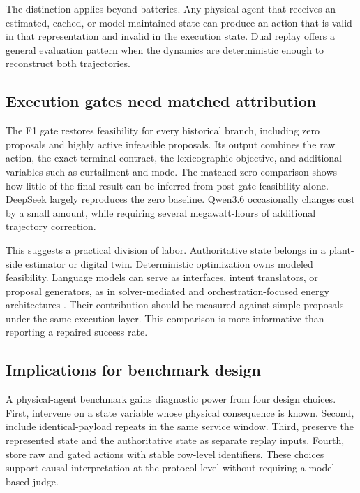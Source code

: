 \documentclass[11pt]{article}
\begin{document}
The distinction applies beyond batteries. Any physical agent that receives an estimated,
cached, or model-maintained state can produce an action that is valid in that representation and
invalid in the execution state. Dual replay offers a general evaluation pattern when the dynamics
are deterministic enough to reconstruct both trajectories.

\subsection{Execution gates need matched attribution}

The F1 gate restores feasibility for every historical branch, including zero proposals and highly
active infeasible proposals. Its output combines the raw action, the exact-terminal contract, the
lexicographic objective, and additional variables such as curtailment and mode. The matched zero
comparison shows how little of the final result can be inferred from post-gate feasibility alone.
DeepSeek largely reproduces the zero baseline. Qwen3.6 occasionally changes cost by a small amount,
while requiring several megawatt-hours of additional trajectory correction.

This suggests a practical division of labor. Authoritative state belongs in a plant-side estimator
or digital twin. Deterministic optimization owns modeled feasibility. Language models can serve as
interfaces, intent translators, or proposal generators, as in solver-mediated and orchestration-focused energy architectures \cite{su2026microgrid,zhao2026carbonagent}. Their contribution should be measured
against simple proposals under the same execution layer. This comparison is more
informative than reporting a repaired success rate.

\subsection{Implications for benchmark design}

A physical-agent benchmark gains diagnostic power from four design choices. First, intervene on a
state variable whose physical consequence is known. Second, include identical-payload repeats in
the same service window. Third, preserve the represented state and the authoritative state as
separate replay inputs. Fourth, store raw and gated actions with stable row-level identifiers.
These choices support causal interpretation at the protocol level without requiring a model-based
judge.
\end{document}
